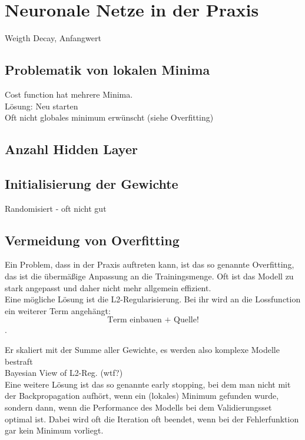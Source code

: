 \section{Neuronale Netze in der Praxis}
Weigth Decay, Anfangwert

\subsection{Problematik von lokalen Minima}
Cost function hat mehrere Minima.
\\
Lösung: Neu starten
\\ 
Oft nicht globales minimum erwünscht (siehe Overfitting)

\subsection{Anzahl Hidden Layer}

\subsection{Initialisierung der Gewichte}
Randomisiert - oft nicht gut

\subsection{Vermeidung von Overfitting}
Ein Problem, dass in der Praxis auftreten kann, ist das so genannte Overfitting, das ist die übermäßige Anpassung an die Trainingsmenge. Oft ist das Modell zu stark angepasst und daher nicht mehr allgemein effizient.\\

Eine mögliche Lösung ist die L2-Regularisierung. Bei ihr wird an die Lossfunction ein weiterer Term angehängt:\\

\begin{equation}
\text{Term einbauen + Quelle!}
\end{equation}.

Er skaliert mit der Summe aller Gewichte, es werden also komplexe Modelle bestraft 
\\Bayesian View of L2-Reg. (wtf?)\\

Eine weitere Lösung ist das so genannte early stopping, bei dem man nicht mit der Backpropagation aufhört, wenn ein (lokales) Minimum gefunden wurde, sondern dann, wenn die Performance des Modells bei dem Validierungsset optimal ist. Dabei wird oft die Iteration oft beendet, wenn bei der Fehlerfunktion gar kein Minimum vorliegt. 

